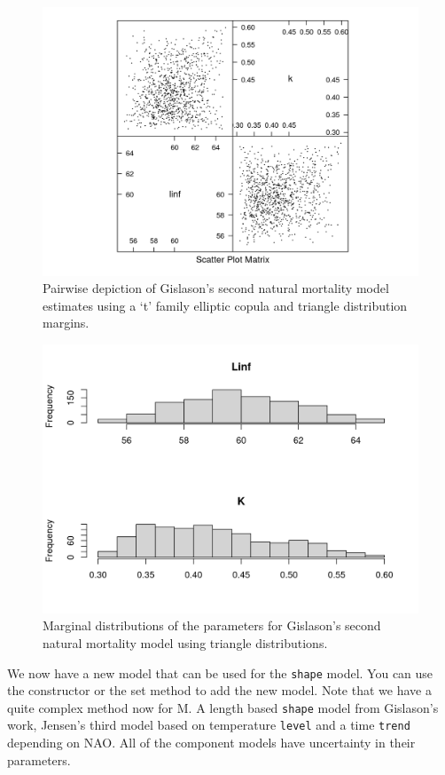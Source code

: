\documentclass[
]{book}
\begin{document}
\begin{figure}
\centering
\includegraphics{_bookdown_files/_main_files/figure-html/plottrigism-1.png}
\caption{\label{fig:plottrigism}Pairwise depiction of Gislason's second natural mortality model estimates using a `t' family elliptic copula and triangle distribution margins.}
\end{figure}

\begin{figure}
\centering
\includegraphics{_bookdown_files/_main_files/figure-html/plottrigismhist-1.png}
\caption{\label{fig:plottrigismhist}Marginal distributions of the parameters for Gislason's second natural mortality model using triangle distributions.}
\end{figure}

We now have a new model that can be used for the \texttt{shape} model. You can use the constructor or the set method to add the new model. Note that we have a quite complex method now for M. A length based \texttt{shape} model from Gislason's work, Jensen's third model based on temperature \texttt{level} and a time \texttt{trend} depending on NAO. All of the component models have uncertainty in their parameters.
\end{document}
